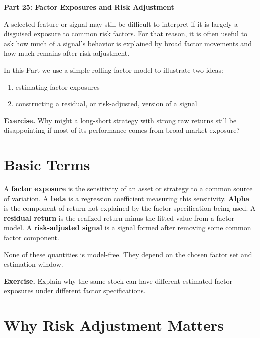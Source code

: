 \documentclass[11pt]{article}
\newcommand{\answerlines}[1]{\vspace{#1\baselineskip}}
\begin{document}
\begin{center}
{\Large \textbf{Part 25: Factor Exposures and Risk Adjustment}}
\end{center}

A selected feature or signal may still be difficult to interpret if it is
largely a disguised exposure to common risk factors. For that reason, it is
often useful to ask how much of a signal's behavior is explained by broad
factor movements and how much remains after risk adjustment.

In this Part we use a simple rolling factor model to illustrate two ideas:

\begin{enumerate}
  \item estimating factor exposures
  \item constructing a residual, or risk-adjusted, version of a signal
\end{enumerate}

\textbf{Exercise.} Why might a long-short strategy with strong raw returns
still be disappointing if most of its performance comes from broad market
exposure?

\answerlines{6}

\newpage

\section*{Basic Terms}

A \textbf{factor exposure} is the sensitivity of an asset or strategy to a
common source of variation. A \textbf{beta} is a regression coefficient
measuring this sensitivity. \textbf{Alpha} is the component of return not
explained by the factor specification being used. A \textbf{residual return} is
the realized return minus the fitted value from a factor model. A
\textbf{risk-adjusted signal} is a signal formed after removing some common
factor component.

None of these quantities is model-free. They depend on the chosen factor set
and estimation window.

\textbf{Exercise.} Explain why the same stock can have different estimated
factor exposures under different factor specifications.

\answerlines{6}

\newpage

\section*{Why Risk Adjustment Matters}
\end{document}
